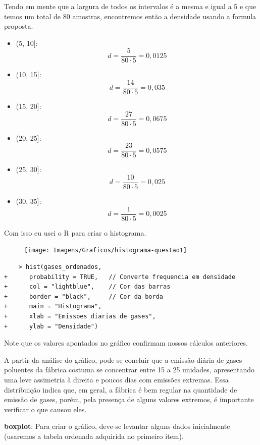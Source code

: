 \documentclass[a4paper,11pt]{article}
\begin{document}
\begin{description}
Tendo em mente que a largura de todos os intervalos é a mesma e igual a 5 e que temos um total de 80 amostras, encontremos então a densidade usando a formula proposta.

\begin{itemize}
    \item (5, 10]:
        \[d = \frac{5}{80 \cdot 5} = 0,0125 \]
    \item (10, 15]:
        \[d = \frac{14}{80 \cdot 5} = 0,035 \]
    \item (15, 20]:
        \[d = \frac{27}{80 \cdot 5} = 0,0675 \]
    \item (20, 25]:
        \[d = \frac{23}{80 \cdot 5} = 0,0575 \]
    \item (25, 30]:
        \[d = \frac{10}{80 \cdot 5} = 0,025 \]
    \item (30, 35]:
        \[d = \frac{1}{80 \cdot 5} = 0,0025 \]
\end{itemize}

Com isso eu usei o R para criar o histograma.

    \begin{figure}[H] 
        \centering
        \texttt{[image: Imagens/Graficos/histograma-questao1]} 
    \end{figure}

\begin{lstlisting}
    > hist(gases_ordenados, 
+      probability = TRUE,   // Converte frequencia em densidade
+      col = "lightblue",    // Cor das barras
+      border = "black",     // Cor da borda
+      main = "Histograma", 
+      xlab = "Emissoes diarias de gases", 
+      ylab = "Densidade")
\end{lstlisting}

Note que os valores apontados no gráfico confirmam nossos cálculos anteriores.



\vspace{5mm} %

A partir da análise do gráfico, pode-se concluir que a emissão diária de gases poluentes da fábrica costuma se concentrar entre 15 a 25 unidades, apresentando uma leve assimetria à direita e poucos dias com emissões extremas. Essa distribuição indica que, em geral, a fábrica é bem regular na quantidade de emissão de gases, porém, pela presença de alguns valores extremos, é importante verificar o que causou eles.

\textbf{boxplot}: Para criar o gráfico, deve-se levantar alguns dados inicialmente (usaremos a tabela ordenada adquirida no primeiro item).


\end{description}
\end{document}
